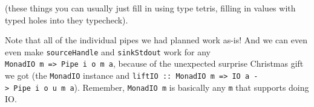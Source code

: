 \documentclass[]{article}
\newenvironment{Shaded}{}{}
\newcommand{\CommentTok}[1]{\textcolor[rgb]{0.38,0.63,0.69}{\textit{#1}}}
\newcommand{\DataTypeTok}[1]{\textcolor[rgb]{0.56,0.13,0.00}{#1}}
\newcommand{\FunctionTok}[1]{\textcolor[rgb]{0.02,0.16,0.49}{#1}}
\newcommand{\NormalTok}[1]{#1}
\newcommand{\OperatorTok}[1]{\textcolor[rgb]{0.40,0.40,0.40}{#1}}
\newcommand{\OtherTok}[1]{\textcolor[rgb]{0.00,0.44,0.13}{#1}}
\begin{document}
\begin{Shaded}
\end{Shaded}

(these things you can usually just fill in using type tetris, filling in values
with typed holes into they typecheck).

Note that all of the individual pipes we had planned work as-is! And we can even
even make \texttt{sourceHandle} and \texttt{sinkStdout} work for any
\texttt{MonadIO\ m\ =\textgreater{}\ Pipe\ i\ o\ m\ a}, because of the
unexpected surprise Christmas gift we got (the \texttt{MonadIO} instance and
\texttt{liftIO\ ::\ MonadIO\ m\ =\textgreater{}\ IO\ a\ -\textgreater{}\ Pipe\ i\ o\ u\ m\ a}).
Remember, \texttt{MonadIO\ m} is basically any \texttt{m} that supports doing
IO.
\end{document}
